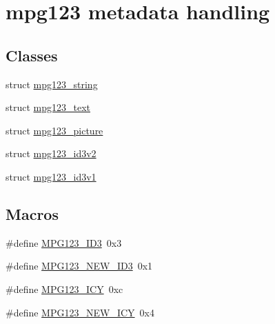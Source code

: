 \hypertarget{group__mpg123__metadata}{}\section{mpg123 metadata handling}
\label{group__mpg123__metadata}
\subsection*{Classes}
\begin{DoxyCompactItemize}
\item 
struct \mbox{\hyperlink{structmpg123__string}{mpg123\+\_\+string}}
\item 
struct \mbox{\hyperlink{structmpg123__text}{mpg123\+\_\+text}}
\item 
struct \mbox{\hyperlink{structmpg123__picture}{mpg123\+\_\+picture}}
\item 
struct \mbox{\hyperlink{structmpg123__id3v2}{mpg123\+\_\+id3v2}}
\item 
struct \mbox{\hyperlink{structmpg123__id3v1}{mpg123\+\_\+id3v1}}
\end{DoxyCompactItemize}
\subsection*{Macros}
\begin{DoxyCompactItemize}
\item 
\#define \mbox{\hyperlink{group__mpg123__metadata_gacee1d4e2cac4601f57eddadcc828f66c}{M\+P\+G123\+\_\+\+I\+D3}}~0x3
\item 
\#define \mbox{\hyperlink{group__mpg123__metadata_ga3fb42527b89f66d9caa6aee4fa6aaaae}{M\+P\+G123\+\_\+\+N\+E\+W\+\_\+\+I\+D3}}~0x1
\item 
\#define \mbox{\hyperlink{group__mpg123__metadata_ga8beaa04ade9db672e2bdf722c66b61ce}{M\+P\+G123\+\_\+\+I\+CY}}~0xc
\item 
\#define \mbox{\hyperlink{group__mpg123__metadata_ga25db33a48f531fd4da02dbf12d53e5be}{M\+P\+G123\+\_\+\+N\+E\+W\+\_\+\+I\+CY}}~0x4
\end{DoxyCompactItemize}
